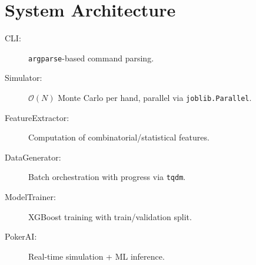 \section{System Architecture}
\begin{description}
  \item[CLI:] \texttt{argparse}-based command parsing.
  \item[Simulator:] $\mathcal{O}(N)$ Monte Carlo per hand, parallel via \texttt{joblib.Parallel}.
  \item[FeatureExtractor:] Computation of combinatorial/statistical features.
  \item[DataGenerator:] Batch orchestration with progress via \texttt{tqdm}.
  \item[ModelTrainer:] XGBoost training with train/validation split.
  \item[PokerAI:] Real-time simulation + ML inference.
\end{description}
